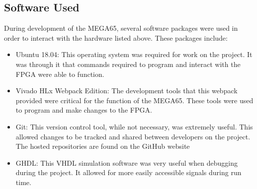 \subsection{Software Used}

\label{Ch3 Sec2 Sub2}

During development of the MEGA65, several software packages were used in order to interact with the hardware listed above. These packages include:\\

\begin{itemize}
\item{Ubuntu 18.04: This operating system was required for work on the project. It was through it that commands required to program and interact with the FPGA were able to function.}
\item{Vivado HLx Webpack Edition: The development tools that this webpack provided were critical for the function of the MEGA65. These tools were used to program and make changes to the FPGA.}
\item{Git: This version control tool, while not necessary, was extremely useful. This allowed changes to be tracked and shared between developers on the project. The hosted repositories are found on the GitHub website}
\item{GHDL: This VHDL simulation software was very useful when debugging during the project. It allowed for more easily accessible signals during run time.}
\end{itemize}
